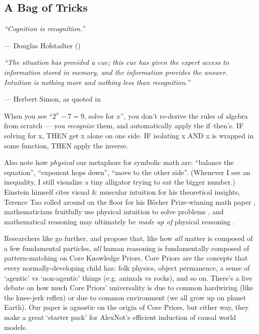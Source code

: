 \documentclass[11pt]{article}
\renewenvironment{quote}
  {\begin{tcolorbox}[enhanced, breakable, sharp corners, frame hidden,
     colback=quotebg, borderline west={3pt}{0pt}{quotebar},
     left=8pt, right=8pt, top=5pt, bottom=5pt,
     before upper={\setlength{\parskip}{0.6em}}]}
  {\end{tcolorbox}}
\begin{document}
\subsection{A Bag of Tricks}
\begin{quote}
\textit{``Cognition is recognition.''}

— Douglas Hofstadter (\citeyear{fluid_concepts})

\bigskip
\textit{``The situation has provided a cue; this cue has given the expert access to information stored in memory, and the information provides the answer. Intuition is nothing more and nothing less than recognition.''}

— Herbert Simon, as quoted in \citet{thinking_fast_and_slow}
\end{quote}
When you see ``$2^x - 7 = 9$, solve for $x$'', you don't re-derive the rules of algebra from scratch — you \textit{recognize} them, and automatically apply the if–then's. IF solving for x, THEN get x alone on one side. IF isolating x AND x is wrapped in some function, THEN apply the inverse.

Also note how \textit{physical} our metaphors for symbolic math are: ``balance the equation'', ``exponent hops down'', ``move to the other side''. (Whenever I see an inequality, I still visualize a tiny alligator trying to eat the bigger number.) Einstein himself cites visual \& muscular intuition \citep{hadamard_invention} for his theoretical insights, Terence Tao rolled around on the floor for his B\^{o}cher Prize-winning math paper \citep{tao_floor_anecdote}, mathematicians fruitfully use physical intuition to solve problems \citep{mathematical_mechanic}, and mathematical reasoning may ultimately be \textit{made up of} physical reasoning \citep{where_math_comes_from}.

Researchers like \citet{core_knowledge_priors} go further, and propose that, like how \textit{all} matter is composed of a few fundamental particles, \textit{all} human reasoning is fundamentally composed of pattern-matching on Core Knowledge Priors. Core Priors are the concepts that every normally-developing child has: folk physics, object permanence, a sense of `agentic' vs `non-agentic' things (e.g. animals vs rocks), and so on. There's a live debate on how much Core Priors' universality is due to common hardwiring (like the knee-jerk reflex) or due to common environment (we all grow up on planet Earth). Our paper is agnostic on the origin of Core Priors, but either way, they make a great `starter pack' for AlexNot's efficient induction of causal world models.
\end{document}
